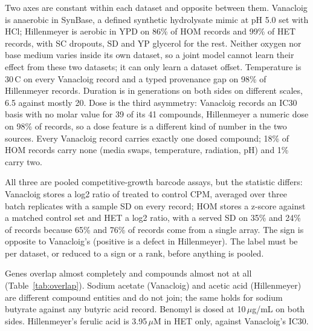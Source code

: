 Two axes are constant within each dataset and opposite between them. Vanacloig is
anaerobic in SynBase, a defined synthetic hydrolysate mimic at pH 5.0 set with HCl;
Hillenmeyer is aerobic in YPD on 86\% of HOM records and 99\% of HET records, with SC
dropouts, SD and YP glycerol for the rest. Neither oxygen nor base medium varies inside
its own dataset, so a joint model cannot learn their effect from these two datasets; it
can only learn a dataset offset. Temperature is 30\,C on every Vanacloig record and a
typed provenance gap on 98\% of Hillenmeyer records. Duration is in generations on both
sides on different scales, 6.5 against mostly 20. Dose is the third asymmetry: Vanacloig
records an IC30 basis with no molar value for 39 of its 41 compounds, Hillenmeyer a
numeric dose on 98\% of records, so a dose feature is a different kind of number in the
two sources. Every Vanacloig record carries exactly one dosed compound; 18\% of HOM
records carry none (media swaps, temperature, radiation, pH) and 1\% carry two.

All three are pooled competitive-growth barcode assays, but the statistic differs:
Vanacloig stores a log2 ratio of treated to control CPM, averaged over three batch
replicates with a sample SD on every record; HOM stores a z-score against a matched
control set and HET a log2 ratio, with a served SD on 35\% and 24\% of records because
65\% and 76\% of records come from a single array. The sign is opposite to Vanacloig's
(positive is a defect in Hillenmeyer). The label must be per dataset, or reduced to a
sign or a rank, before anything is pooled.

Genes overlap almost completely and compounds almost not at all
(Table~\ref{tab:overlap}). Sodium acetate (Vanacloig) and acetic acid (Hillenmeyer) are
different compound entities and do not join; the same holds for sodium butyrate against
any butyric acid record. Benomyl is dosed at 10\,$\mu$g/mL on both sides.
Hillenmeyer's ferulic acid is 3.95\,$\mu$M in HET only, against Vanacloig's IC30.

\begin{table}[htbp]
\centering
\footnotesize
\caption{Queried-gene and compound overlaps. Queried genes exclude Vanacloig's three
constant background genes. Compounds are keyed by InChIKey, so a salt and its free acid
are different entries.}
\label{tab:overlap}

\end{table}
